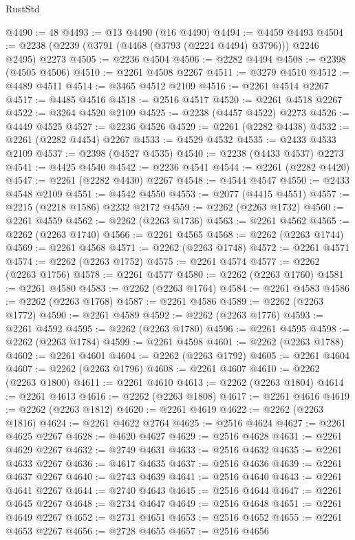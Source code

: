 \begin{lexlean}{RustStd}
\begin{coremodule}
@4490 := 48
@4493 := @13 @4490 (@16 @4490)
@4494 := @4459 @4493
@4504 := @2238 (@2239 (@3791 (@4468 (@3793 (@2224 @4494) @3796))) @2246 @2495) @2273
@4505 := @2236 @4504
@4506 := @2282 @4494
@4508 := @2398 (@4505 @4506)
@4510 := @2261 @4508 @2267
@4511 := @3279 @4510
@4512 := @4489 @4511
@4514 := @3465 @4512 @2109
@4516 := @2261 @4514 @2267
@4517 := @4485 @4516
@4518 := @2516 @4517
@4520 := @2261 @4518 @2267
@4522 := @3264 @4520 @2109
@4525 := @2238 (@4457 @4522) @2273
@4526 := @4449 @4525
@4527 := @2236 @4526
@4529 := @2261 (@2282 @4438)
@4532 := @2261 (@2282 @4454) @2267
@4533 := @4529 @4532
@4535 := @2433 @4533 @2109
@4537 := @2398 (@4527 @4535)
@4540 := @2238 (@4433 @4537) @2273
@4541 := @4425 @4540
@4542 := @2236 @4541
@4544 := @2261 (@2282 @4420)
@4547 := @2261 (@2282 @4430) @2267
@4548 := @4544 @4547
@4550 := @2433 @4548 @2109
@4551 := @4542 @4550
@4553 := @2077 (@4415 @4551)
@4557 := @2215 (@2218 @1586) @2232 @2172
@4559 := @2262 (@2263 @1732)
@4560 := @2261 @4559
@4562 := @2262 (@2263 @1736)
@4563 := @2261 @4562
@4565 := @2262 (@2263 @1740)
@4566 := @2261 @4565
@4568 := @2262 (@2263 @1744)
@4569 := @2261 @4568
@4571 := @2262 (@2263 @1748)
@4572 := @2261 @4571
@4574 := @2262 (@2263 @1752)
@4575 := @2261 @4574
@4577 := @2262 (@2263 @1756)
@4578 := @2261 @4577
@4580 := @2262 (@2263 @1760)
@4581 := @2261 @4580
@4583 := @2262 (@2263 @1764)
@4584 := @2261 @4583
@4586 := @2262 (@2263 @1768)
@4587 := @2261 @4586
@4589 := @2262 (@2263 @1772)
@4590 := @2261 @4589
@4592 := @2262 (@2263 @1776)
@4593 := @2261 @4592
@4595 := @2262 (@2263 @1780)
@4596 := @2261 @4595
@4598 := @2262 (@2263 @1784)
@4599 := @2261 @4598
@4601 := @2262 (@2263 @1788)
@4602 := @2261 @4601
@4604 := @2262 (@2263 @1792)
@4605 := @2261 @4604
@4607 := @2262 (@2263 @1796)
@4608 := @2261 @4607
@4610 := @2262 (@2263 @1800)
@4611 := @2261 @4610
@4613 := @2262 (@2263 @1804)
@4614 := @2261 @4613
@4616 := @2262 (@2263 @1808)
@4617 := @2261 @4616
@4619 := @2262 (@2263 @1812)
@4620 := @2261 @4619
@4622 := @2262 (@2263 @1816)
@4624 := @2261 @4622 @2764
@4625 := @2516 @4624
@4627 := @2261 @4625 @2267
@4628 := @4620 @4627
@4629 := @2516 @4628
@4631 := @2261 @4629 @2267
@4632 := @2749 @4631
@4633 := @2516 @4632
@4635 := @2261 @4633 @2267
@4636 := @4617 @4635
@4637 := @2516 @4636
@4639 := @2261 @4637 @2267
@4640 := @2743 @4639
@4641 := @2516 @4640
@4643 := @2261 @4641 @2267
@4644 := @2740 @4643
@4645 := @2516 @4644
@4647 := @2261 @4645 @2267
@4648 := @2734 @4647
@4649 := @2516 @4648
@4651 := @2261 @4649 @2267
@4652 := @2731 @4651
@4653 := @2516 @4652
@4655 := @2261 @4653 @2267
@4656 := @2728 @4655
@4657 := @2516 @4656

\end{coremodule}
\end{lexlean}
